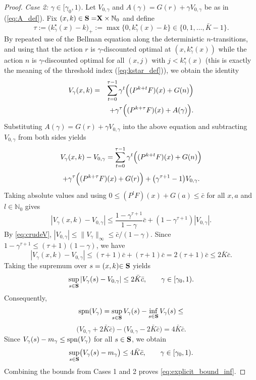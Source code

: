 \documentclass[letterpaper,10pt,conference]{ieeeconf}  %
\newcommand{\spn}{{\rm spn}}
\begin{document}
\begin{proof}
\smallskip
\noindent\emph{Case 2: $\gamma\in[\gamma_0,1)$.}
Let $V_{0,\gamma}$ and $A{(\gamma)}=G(r)+\gamma V_{0,\gamma}$ be as in (\ref{eq:A_def}). 
Fix $(x,k)\in {{\bf S}=}{\bf X}\times \mathbb N_0$ and define
\[
\tau := \bigl(k^\star_\gamma(x)-k\bigr)_+{:=\max\{0,k^\star_\gamma(x)-k\}} \in\{0,1,\dots,{\bar{K}}-1\}.
\]
By repeated use of the Bellman equation along the deterministic $n$-transitions,
and using that {the action} $r$ is {$\gamma$-discounted} optimal at $(x,k^\star_\gamma(x))$ while {the action} $n$ is {$\gamma$-discounted} optimal for all
$(x,j)$ with $j<k^\star_\gamma(x)$ (this is exactly the meaning of the threshold 
index (\ref{eq:kstar_def})), we obtain the identity
\begin{eqnarray*}
V_\gamma(x,k) & = &
\sum_{t=0}^{\tau-1}\gamma^t\Bigl((P^{k+t}F)(x)+G(n)\Bigr) \\
& & +\gamma^\tau\Bigl((P^{k+\tau}F)(x)+{A(\gamma)} \Bigr).
\end{eqnarray*}
Substituting ${A(\gamma)}=G(r)+\gamma V_{0,\gamma}$ into the above equation and subtracting $V_{0,\gamma}$
from both sides yields
\[
V_\gamma(x,k)-V_{0,\gamma} =
\sum_{t=0}^{\tau-1}\gamma^t\Bigl((P^{k+t}F)(x)+G(n)\Bigr)
\]
\[
+\gamma^\tau\Bigl((P^{k+\tau}F)(x)+G(r)\Bigr)
+\bigl(\gamma^{\tau+1}-1\bigr)V_{0,\gamma}.
\]
Taking absolute values and using ${0\le (P^{l}F)(x)+G(a)}\le \bar c$ {for all $x,a$ and $l\in\mathbb{N}_0$} gives
\[
|V_{{\gamma}}(x,k)-V_{0,\gamma}|
\le \frac{1-\gamma^{\tau+1}}{1-\gamma} \bar c + (1-\gamma^{\tau+1})|V_{0,\gamma}|.
\]
By \eqref{eq:crudeV}, $|V_{0,\gamma}|\le \|{V_\gamma}\|_\infty\le \bar c/(1-\gamma)$. Since
$1-\gamma^{\tau+1}\le (\tau+1)(1-\gamma)$, we have
\[
|{V_\gamma}(x,k)-V_{0,\gamma}|
\le (\tau+1)\bar c + (\tau+1)\bar c
= 2(\tau+1)\bar c
\le 2 {\bar{K}} \bar c.
\]
Taking the supremum over $s=(x,k){\in {\bf S}}$ yields
\begin{equation}
\label{eq:unif_to_V0}
\sup_{s{\in {\bf S}}}|{V_\gamma}(s)-V_{0,\gamma}| \le 2 {\bar{K}} \bar c,
\qquad \gamma\in[\gamma_0,1).
\end{equation}
Consequently,
\[
\spn({V_\gamma})
=\sup_{s\in {\bf S}} {V_\gamma}(s)-\inf_{s\in {\bf S}} {V_\gamma}(s) \le 
\]
\[
\bigl(V_{0,\gamma} + 2{\bar{K}}\bar c\bigr)-\bigl(V_{0,\gamma} - 2{\bar{K}}\bar c\bigr)
=4{\bar{K}}\bar c.
\]
Since ${V_\gamma}(s)-m_\gamma\le \spn({V_\gamma})$ for all $s\in {\bf S}$, we obtain
\[
\sup_{s\in {\bf S}}\bigl({V_\gamma}(s)-m_\gamma\bigr)\le 4 {\bar{K}} \bar c,
\qquad \gamma\in[\gamma_0,1).
\]
Combining the bounds from Cases 1 and 2 proves \eqref{eq:explicit_bound_inf}.
\end{proof}
\end{document}
